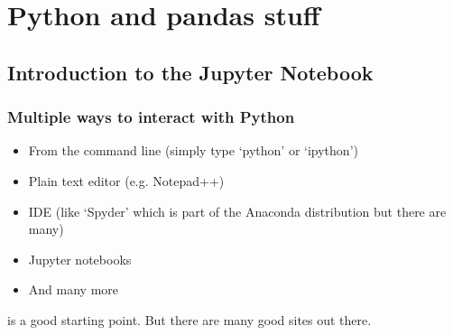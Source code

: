 \documentclass[letterpaper,10pt,english]{jupyterBook}
\begin{document}
\part{Python and pandas stuff}

\sphinxstepscope


\chapter{Introduction to the Jupyter Notebook}
\label{\detokenize{content/Python/Intro_Jupyter_notebook:introduction-to-the-jupyter-notebook}}\label{\detokenize{content/Python/Intro_Jupyter_notebook::doc}}

\section{Multiple ways to interact with Python}
\label{\detokenize{content/Python/Intro_Jupyter_notebook:multiple-ways-to-interact-with-python}}\begin{itemize}
\item {} 
\sphinxAtStartPar
From the command line (simply type ‘python’ or ‘ipython’)

\item {} 
\sphinxAtStartPar
Plain text editor (e.g. Notepad++)

\item {} 
\sphinxAtStartPar
IDE (like  ‘Spyder’ which is part of the Anaconda distribution but there are many)

\item {} 
\sphinxAtStartPar
Jupyter notebooks

\item {} 
\sphinxAtStartPar
And many more

\end{itemize}

\sphinxAtStartPar
{}

\sphinxAtStartPar
{} is a good starting point. But there are many good sites out there.
\end{document}
